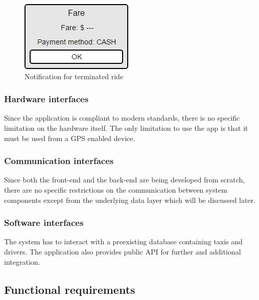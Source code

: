 \documentclass{article}
\begin{document}
\begin{itemize}
    \begin{figure}[h!]
        \centering
        \includegraphics[width=0.3\columnwidth]{driver/driver-fare}
        \caption{Notification for terminated ride}
        \label{fig:driver-notification}
    \end{figure}
\newpage

\end{itemize}

\subsubsection{Hardware interfaces}
Since the application is compliant to modern standards, there is no specific limitation on the hardware itself. The only limitation to use the app is that it must be used from a GPS enabled device.

\subsubsection{Communication interfaces}
Since both the front-end and the back-end are being developed from scratch, there are no specific restrictions on the communication between system components except from the underlying data layer which will be discussed later.

\subsubsection{Software interfaces}
The system has to interact with a preexisting database containing taxis and drivers.
The application also provides public API for further and additional integration.

\newpage
\subsection{Functional requirements}
\end{document}

